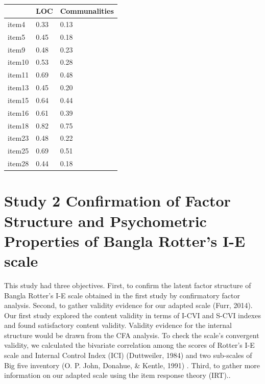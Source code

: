 \documentclass[
  man]{apa6}
\begin{document}
\begin{table}[tbp]

\begin{center}
\begin{threeparttable}

\caption{\label{tab:TabEFA1}}

\begin{tabular}{lll}
\toprule
 & \multicolumn{1}{c}{LOC} & \multicolumn{1}{c}{Communalities}\\
\midrule
item4 & 0.33 & 0.13\\
item5 & 0.45 & 0.18\\
item9 & 0.48 & 0.23\\
item10 & 0.53 & 0.28\\
item11 & 0.69 & 0.48\\
item13 & 0.45 & 0.20\\
item15 & 0.64 & 0.44\\
item16 & 0.61 & 0.39\\
item18 & 0.82 & 0.75\\
item23 & 0.48 & 0.22\\
item25 & 0.69 & 0.51\\
item28 & 0.44 & 0.18\\
\bottomrule
\end{tabular}

\end{threeparttable}
\end{center}

\end{table}

\hypertarget{study-2-confirmation-of-factor-structure-and-psychometric-properties-of-bangla-rotters-i-e-scale}{%
\section{Study 2 Confirmation of Factor Structure and Psychometric Properties of Bangla Rotter's I-E scale}\label{study-2-confirmation-of-factor-structure-and-psychometric-properties-of-bangla-rotters-i-e-scale}}

This study had three objectives. First, to confirm the latent factor structure of Bangla Rotter's I-E scale obtained in the first study by confirmatory factor analysis. Second, to gather validity evidence for our adapted scale (Furr, 2014). Our first study explored the content validity in terms of I-CVI and S-CVI indexes and found satisfactory content validity. Validity evidence for the internal structure would be drawn from the CFA analysis. To check the scale's convergent validity, we calculated the bivariate correlation among the scores of Rotter's I-E scale and Internal Control Index (ICI) (Duttweiler, 1984) and two sub-scales of Big five inventory (O. P. John, Donahue, \& Kentle, 1991) . Third, to gather more information on our adapted scale using the item response theory (IRT)..
\end{document}
